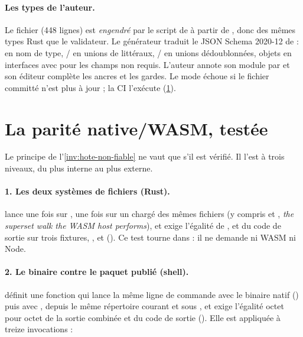 \paragraph{Les types de l'auteur.} Le fichier  (448 lignes) est \emph{engendré} par le script  de  à partir de , donc des mêmes types Rust que le validateur. Le générateur traduit le JSON Schema 2020-12 de  :  en nom de type, / en unions de littéraux, / en unions dédoublonnées, objets en interfaces avec  pour les champs non requis. L'auteur annote son module par  et son éditeur complète les ancres et les gardes. Le mode  échoue si le fichier committé n'est plus à jour ; la CI l'exécute (\cref{sec:distribution-parite}).

\section{La parité native/WASM, testée}
\label{sec:distribution-parite}

Le principe de l'\cref{inv:hote-non-fiable} ne vaut que s'il est vérifié. Il l'est à trois niveaux, du plus interne au plus externe.

\paragraph{1. Les deux systèmes de fichiers (Rust).}  lance  une fois sur , une fois sur un  chargé des mêmes fichiers (y compris  et , \og \emph{the superset walk the WASM host performs}\fg{}), et exige l'égalité de ,  et du code de sortie sur trois fixtures, ,  et  (). Ce test tourne dans  : il ne demande ni WASM ni Node.

\paragraph{2. Le binaire contre le paquet publié (shell).}  définit une fonction  qui lance la même ligne de commande avec le binaire natif () puis avec , depuis le même répertoire courant et sous , et exige l'égalité octet pour octet de la sortie combinée et du code de sortie (). Elle est appliquée à treize invocations :

